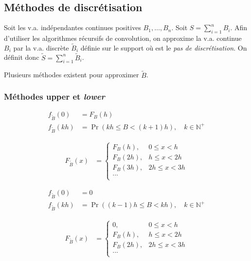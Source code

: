 \documentclass[10pt, french]{article}
\begin{document}
\begin{multicols*}{2}
\columnbreak
\subsection{Méthodes de discrétisation}
Soit les v.a. indépendantes continues positives $B_{1}, \dots, B_{n}$.
Soit $S	=	\sum_{i	=	1}^{n}B_{i}$.
Afin d'utiliser les algorithmes récursifs de convolution, on approxime la v.a. continue $B_{i}$ par la v.a. discrète $\tilde{B}_{i}$ définie sur le support  où  est le \textit{pas de discrétisation}.
On définit donc $\tilde{S}	=	\sum_{i	=	1}^{n}\tilde{B}_{i}$.

Plusieurs méthodes existent pour approximer $\tilde{B}$.


\subsubsection{Méthodes \textbf{upper} et \textit{lower}}
\begin{definitionNOHFILLprop}
\begin{align*}
	f_{\tilde{B}}(0)
	&=	F_{B}(h)	\\
	f_{\tilde{B}}(kh)
	&=	\Pr(kh	\leq	B	<	(k + 1)h), \quad k \in \mathbb{N}^{+}
\end{align*}

\begin{align*}
	F_{\tilde{B}}(x)
	&=	\begin{cases}
		F_{B}(h),	&	0	\leq	x	<	h	\\
		F_{B}(2h),	&	h	\leq	x	<	2h	\\
		F_{B}(3h),	&	2h	\leq	x	<	3h	\\
		...	&	\\
		\end{cases}
\end{align*}
\end{definitionNOHFILLprop}

\begin{definitionNOHFILLprop}
\begin{align*}
	f_{\tilde{B}}(0)
	&=	0	\\
	f_{\tilde{B}}(kh)
	&=	\Pr((k - 1)h	\leq	B	<	kh), \quad k \in \mathbb{N}^{+}
\end{align*}

\begin{align*}
	F_{\tilde{B}}(x)
	&=	\begin{cases}
		0,	&	0	\leq	x	<	h	\\
		F_{B}(h),	&	h	\leq	x	<	2h	\\
		F_{B}(2h),	&	2h	\leq	x	<	3h	\\
		...	&	\\
		\end{cases}
\end{align*}
\end{definitionNOHFILLprop}


\end{multicols*}
\end{document}
